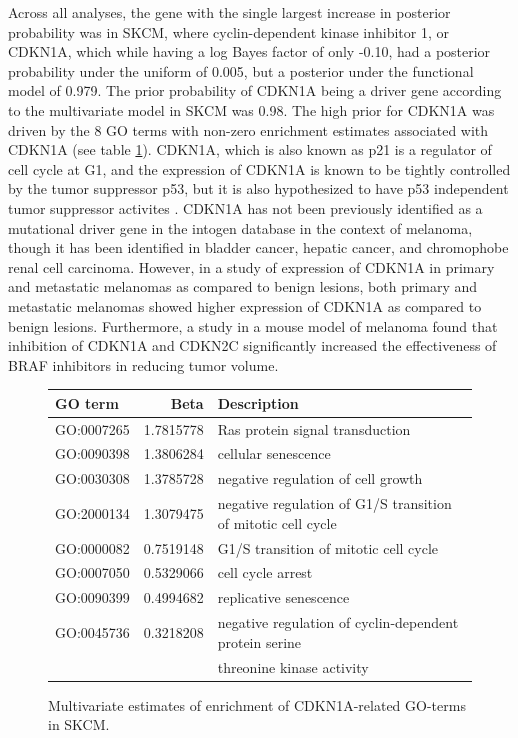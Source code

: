 Across all analyses, the gene with the single largest increase in posterior probability was in SKCM, where cyclin-dependent kinase inhibitor 1, or CDKN1A, which while having a log Bayes factor of only -0.10, had a posterior probability under the uniform of 0.005, but a posterior under the functional model of 0.979.  The prior probability of CDKN1A being a driver gene according to the multivariate model in SKCM was 0.98.  The high prior for CDKN1A was driven by the 8 GO terms with non-zero enrichment estimates associated with CDKN1A (see table \ref{tab:CDKN1A_features}).  CDKN1A, which is also known as p21 is a regulator of cell cycle at G1, and the expression of CDKN1A is known to be tightly controlled by the tumor suppressor p53, but it is also hypothesized to have p53 independent tumor suppressor activites \cite{abbas09_p21_cancer}.  CDKN1A has not been previously identified as a mutational driver gene in the intogen database in the context of melanoma, though it has been identified in bladder cancer, hepatic cancer, and chromophobe renal cell carcinoma\cite{gonzalez-perez13_intog_mutat_ident_cancer_driver}.  However, in a study of expression of CDKN1A in primary and metastatic melanomas as compared to   benign lesions, both primary and metastatic melanomas showed higher expression of CDKN1A as compared to benign lesions\cite{Trotter_1997}.  Furthermore, a study in a mouse model of melanoma found that inhibition of CDKN1A and CDKN2C significantly increased the effectiveness of BRAF inhibitors in reducing tumor volume\cite{Jalili_2012}.  


\begin{figure}
  \centering
  \begin{tabular}{l|r|l}
    \hline
    GO term & Beta & Description\\
    \hline
    GO:0007265 & 1.7815778 & Ras protein signal transduction\\
    \hline
    GO:0090398 & 1.3806284 & cellular senescence\\
    \hline
    GO:0030308 & 1.3785728 & negative regulation of cell growth\\
    \hline
    GO:2000134 & 1.3079475 & negative regulation of G1/S transition of mitotic cell cycle\\
    \hline
    GO:0000082 & 0.7519148 & G1/S transition of mitotic cell cycle\\
    \hline
    GO:0007050 & 0.5329066 & cell cycle arrest\\
    \hline
    GO:0090399 & 0.4994682 & replicative senescence\\
    \hline
    GO:0045736 & 0.3218208 & negative regulation of cyclin-dependent protein serine \\
            & & threonine kinase activity\\
    \hline
  \end{tabular}\label{tab:CDKN1A_features}
  \caption{Multivariate estimates of enrichment of CDKN1A-related GO-terms in SKCM.}
\end{figure}

